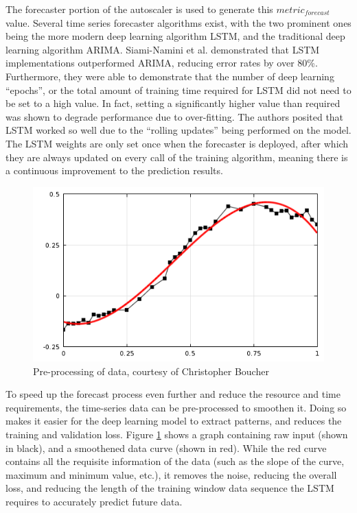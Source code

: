 The forecaster portion of the autoscaler is used to generate this $metric_{forecast}$ value. Several time series forecaster algorithms exist, with the two prominent ones being the more modern deep learning algorithm LSTM, and the traditional deep learning algorithm ARIMA. Siami-Namini et al. \cite{siami2018comparison} demonstrated that LSTM implementations outperformed ARIMA, reducing error rates by over 80\%. Furthermore, they were able to demonstrate that the number of deep learning ``epochs'', or the total amount of training time required for LSTM did not need to be set to a high value. In fact, setting a significantly higher value than required was shown to degrade performance due to over-fitting. The authors posited that LSTM worked so well due to the ``rolling updates'' being performed on the model. The LSTM weights are only set once when the forecaster is deployed, after which they are always updated on every call of the training algorithm, meaning there is a continuous improvement to the prediction results.\par

\begin{figure}[htb]
    \centering
    \caption{Pre-processing of data, courtesy of Christopher Boucher \cite{comsolcurvefitting}}
    \label{fig:data-pre-process}
    \includegraphics[width=0.6\linewidth]{Figures/Data-Pre-Processing.png}
\end{figure}



To speed up the forecast process even further and reduce the resource and time requirements, the time-series data can be pre-processed to smoothen it. Doing so makes it easier for the deep learning model to extract patterns, and reduces the training and validation loss. Figure \ref{fig:data-pre-process} shows a graph containing raw input (shown in black), and a smoothened data curve (shown in red). While the red curve contains all the requisite information of the data (such as the slope of the curve, maximum and minimum value, etc.), it removes the noise, reducing the overall loss, and reducing the length of the training window data sequence the LSTM requires to accurately predict future data.\par

